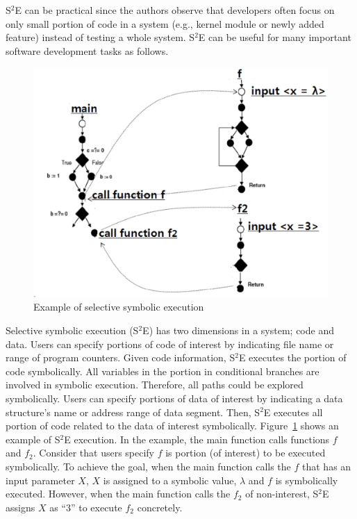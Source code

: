 S$^2$E can be practical since the authors observe that developers often focus on only small portion of code in a system (e.g., kernel module or newly added feature) instead of testing a whole system. S$^2$E can be useful for many important software development tasks as follows.

\begin{figure}
\centering
\includegraphics[scale=0.6,clip]{fig/selective.eps} 
\caption{\label{fig:s2e}Example of selective symbolic execution} 
\end{figure}


Selective symbolic execution (S$^2$E) has two dimensions in a system; code and data. Users can specify portions of code of interest by indicating file name or range of program counters. Given code information, S$^2$E executes the portion of code symbolically. All variables in the portion in conditional branches are involved in symbolic execution. Therefore, all paths could be explored symbolically. Users can specify portions of data of interest by indicating a data structure's name or address range of data segment. Then, S$^2$E executes all portion of code related to the data of interest symbolically.
Figure~\ref{fig:s2e} shows an example of S$^2$E execution. In the example, the main function calls functions $f$ and $f_2$. Consider that users specify $f$ is portion (of interest) to be executed symbolically. To achieve the goal, when the main function calls the $f$ that has an input parameter $X$, $X$ is assigned to a symbolic value, $\lambda$ and $f$ is symbolically executed. However, when the main function calls the $f_2$ of non-interest, S$^2$E assigns $X$ as ``3'' to execute $f_2$ concretely.


